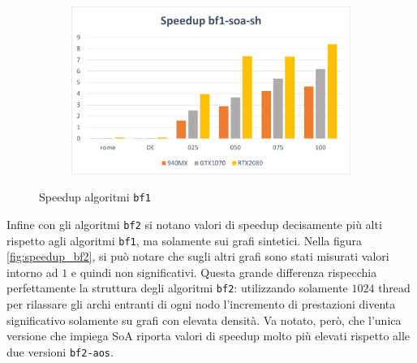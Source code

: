 \documentclass[12pt,a4paper,oneside]{book}
\begin{document}
\begin{figure}[b]
\begin{subfigure}{.5\textwidth}
		\end{subfigure}%
		\begin{subfigure}{.5\textwidth}
			\centering
			\includegraphics[width=\textwidth]{speedup_bf1-soa-sh}
		\end{subfigure}
		\caption{Speedup algoritmi \texttt{bf1}}
		\label{fig:speedup_bf1}
	\end{figure}

	Infine con gli algoritmi \texttt{bf2} si notano valori di speedup decisamente più alti rispetto agli algoritmi \texttt{bf1}, ma solamente sui grafi sintetici. Nella figura \ref{fig:speedup_bf2}, si può notare che sugli altri grafi sono stati misurati valori intorno ad $1$ e quindi non significativi. Questa grande differenza rispecchia perfettamente la struttura degli algoritmi \texttt{bf2}: utilizzando solamente $1024$ thread per rilassare gli archi entranti di ogni nodo l'incremento di prestazioni diventa significativo solamente su grafi con elevata densità. Va notato, però, che l'unica versione che impiega SoA riporta valori di speedup molto più elevati rispetto alle due versioni \texttt{bf2-aos}.
\end{document}
